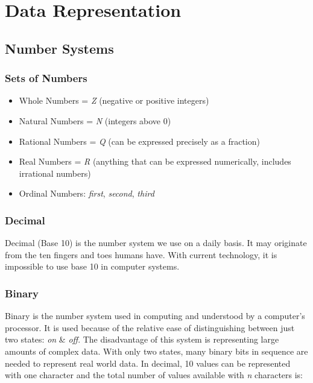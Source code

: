\documentclass[10pt]{article}
\let\oldsection\section
\renewcommand\section{\clearpage\oldsection}
\begin{document}
\section{Data Representation}
\label{sec:orgb70cd6c}
\subsection{Number Systems}
\label{sec:orgcb80570}
\subsubsection{Sets of Numbers}
\label{sec:org5d6d2c0}

\begin{itemize}
\item Whole Numbers = \emph{Z} (negative or positive integers)
\item Natural Numbers = \emph{N} (integers above 0)
\item Rational Numbers = \emph{Q} (can be expressed precisely as a fraction)
\item Real Numbers = \emph{R} (anything that can be expressed numerically, includes irrational numbers)
\item Ordinal Numbers: \emph{first}, \emph{second}, \emph{third}
\end{itemize}

\subsubsection{Decimal}
\label{sec:orgf4cca0a}

Decimal (Base 10) is the number system we use on a daily basis. It may originate from the ten fingers and toes humans have. With current technology, it is impossible to use base 10 in computer systems.

\subsubsection{Binary}
\label{sec:org12f0e84}

Binary is the number system used in computing and understood by a computer's processor. It is used because of the relative ease of distinguishing between just two states: \emph{on} \& \emph{off}. The disadvantage of this system is representing large amounts of complex data. With only two states, many binary bits in sequence are needed to represent real world data. In decimal, 10 values can be represented with one character and the total number of values available with \emph{n} characters is:
\end{document}
